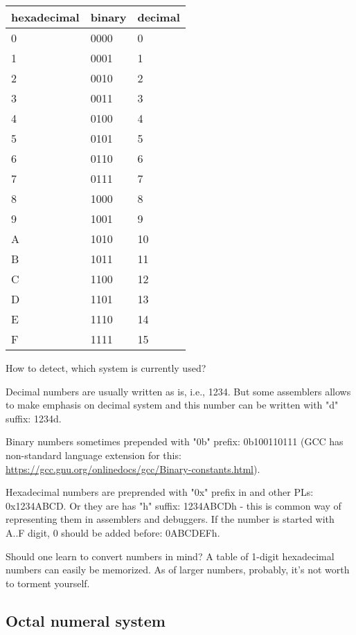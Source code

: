 \begin{center}
\begin{longtable}{ | l | l | l | }
\hline
\cellcolor{blue!25} hexadecimal & \cellcolor{blue!25} binary & \cellcolor{blue!25} decimal \\
\hline
0	&0000	&0 \\
1	&0001	&1 \\
2	&0010	&2 \\
3	&0011	&3 \\
4	&0100	&4 \\
5	&0101	&5 \\
6	&0110	&6 \\
7	&0111	&7 \\
8	&1000	&8 \\
9	&1001	&9 \\
A	&1010	&10 \\
B	&1011	&11 \\
C	&1100	&12 \\
D	&1101	&13 \\
E	&1110	&14 \\
F	&1111	&15 \\
\hline
\end{longtable}
\end{center}

How to detect, which system is currently used?

Decimal numbers are usually written as is, i.e., 1234. But some assemblers allows to make emphasis on decimal system and this number can be written with "d" suffix: 1234d.

Binary numbers sometimes prepended with "0b" prefix: 0b100110111 (\ac{GCC} has non-standard language extension for this: \url{https://gcc.gnu.org/onlinedocs/gcc/Binary-constants.html}).

Hexadecimal numbers are preprended with "0x" prefix in \CCpp and other \ac{PL}s: 0x1234ABCD.
Or they are has "h" suffix: 1234ABCDh - this is common way of representing them in assemblers and debuggers.
If the number is started with A..F digit, 0 should be added before: 0ABCDEFh.

Should one learn to convert numbers in mind? A table of 1-digit hexadecimal numbers can easily be memorized.
As of larger numbers, probably, it's not worth to torment yourself.

\subsection{Octal numeral system}

